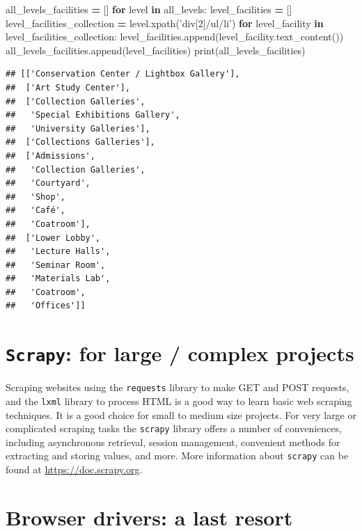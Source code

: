 \documentclass[]{book}
\newenvironment{Shaded}{\begin{snugshade}}{\end{snugshade}}
\newcommand{\BuiltInTok}[1]{#1}
\newcommand{\ControlFlowTok}[1]{\textcolor[rgb]{0.13,0.29,0.53}{\textbf{#1}}}
\newcommand{\KeywordTok}[1]{\textcolor[rgb]{0.13,0.29,0.53}{\textbf{#1}}}
\newcommand{\NormalTok}[1]{#1}
\newcommand{\OperatorTok}[1]{\textcolor[rgb]{0.81,0.36,0.00}{\textbf{#1}}}
\newcommand{\StringTok}[1]{\textcolor[rgb]{0.31,0.60,0.02}{#1}}
\begin{document}
\begin{Shaded}
\begin{Highlighting}[]
\NormalTok{all_levels_facilities }\OperatorTok{=}\NormalTok{ []}
\ControlFlowTok{for}\NormalTok{ level }\KeywordTok{in}\NormalTok{ all_levels:}
\NormalTok{    level_facilities }\OperatorTok{=}\NormalTok{ []}
\NormalTok{    level_facilities_collection }\OperatorTok{=}\NormalTok{ level.xpath(}\StringTok{'div[2]/ul/li'}\NormalTok{)}
    \ControlFlowTok{for}\NormalTok{ level_facility }\KeywordTok{in}\NormalTok{ level_facilities_collection:}
\NormalTok{        level_facilities.append(level_facility.text_content())}
\NormalTok{    all_levels_facilities.append(level_facilities)}
\BuiltInTok{print}\NormalTok{(all_levels_facilities)}
\end{Highlighting}
\end{Shaded}

\begin{verbatim}
## [['Conservation Center / Lightbox Gallery'],
##  ['Art Study Center'],
##  ['Collection Galleries',
##   'Special Exhibitions Gallery',
##   'University Galleries'],
##  ['Collections Galleries'],
##  ['Admissions',
##   'Collection Galleries',
##   'Courtyard',
##   'Shop',
##   'Café',
##   'Coatroom'],
##  ['Lower Lobby',
##   'Lecture Halls',
##   'Seminar Room',
##   'Materials Lab',
##   'Coatroom',
##   'Offices']]
\end{verbatim}

\hypertarget{scrapy-for-large-complex-projects}{%
\section{\texorpdfstring{\texttt{Scrapy}: for large / complex projects}{Scrapy: for large / complex projects}}\label{scrapy-for-large-complex-projects}}

Scraping websites using the \texttt{requests} library to make GET and POST requests, and the \texttt{lxml} library to process HTML is a good way to learn basic web scraping techniques. It is a good choice for small to medium size projects. For very large or complicated scraping tasks the \texttt{scrapy} library offers a number of conveniences, including asynchronous retrieval, session management, convenient methods for extracting and storing values, and more. More information about \texttt{scrapy} can be found at \url{https://doc.scrapy.org}.

\hypertarget{browser-drivers-a-last-resort}{%
\section{Browser drivers: a last resort}\label{browser-drivers-a-last-resort}}
\end{document}
